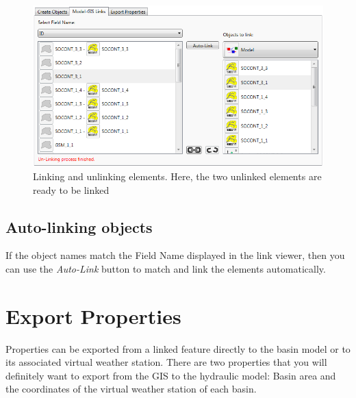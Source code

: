 \documentclass[
  letterpaper,
  DIV=11,
  numbers=noendperiod]{scrreprt}
\begin{document}
\begin{figure}

{\centering \includegraphics{./figures/fig-gis_linking_unlinking_elements.png}

}

\caption{\label{fig-gis_linking_unlinking_elements}Linking and unlinking
elements. Here, the two unlinked elements are ready to be linked}

\end{figure}

\hypertarget{auto-linking-objects}{%
\subsection{Auto-linking objects}\label{auto-linking-objects}}

If the object names match the Field Name displayed in the link viewer,
then you can use the \emph{Auto-Link} button to match and link the
elements automatically.

\hypertarget{export-properties}{%
\section{Export Properties}\label{export-properties}}

Properties can be exported from a linked feature directly to the basin
model or to its associated virtual weather station. There are two
properties that you will definitely want to export from the GIS to the
hydraulic model: Basin area and the coordinates of the virtual weather
station of each basin.
\end{document}
